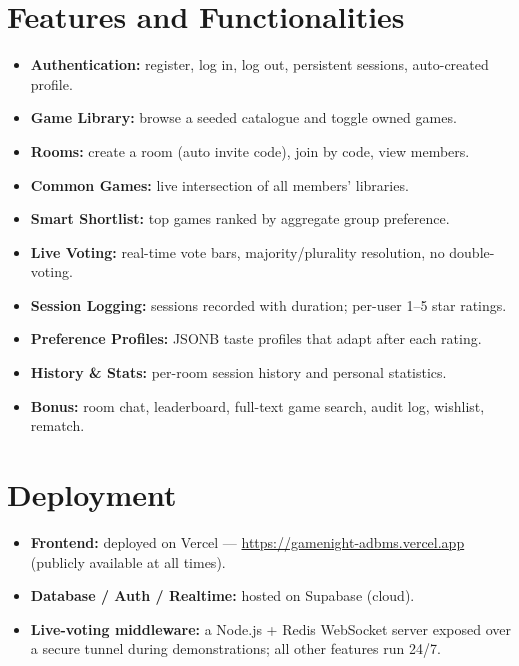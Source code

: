 \documentclass[11pt,a4paper]{article}
\begin{document}
\section{Features and Functionalities}
\begin{itemize}[leftmargin=1.4em]
  \item \textbf{Authentication:} register, log in, log out, persistent sessions, auto-created profile.
  \item \textbf{Game Library:} browse a seeded catalogue and toggle owned games.
  \item \textbf{Rooms:} create a room (auto invite code), join by code, view members.
  \item \textbf{Common Games:} live intersection of all members' libraries.
  \item \textbf{Smart Shortlist:} top games ranked by aggregate group preference.
  \item \textbf{Live Voting:} real-time vote bars, majority/plurality resolution, no double-voting.
  \item \textbf{Session Logging:} sessions recorded with duration; per-user 1--5 star ratings.
  \item \textbf{Preference Profiles:} JSONB taste profiles that adapt after each rating.
  \item \textbf{History \& Stats:} per-room session history and personal statistics.
  \item \textbf{Bonus:} room chat, leaderboard, full-text game search, audit log, wishlist, rematch.
\end{itemize}

\section{Deployment}
\begin{itemize}[leftmargin=1.4em]
  \item \textbf{Frontend:} deployed on Vercel --- \url{https://gamenight-adbms.vercel.app}
        (publicly available at all times).
  \item \textbf{Database / Auth / Realtime:} hosted on Supabase (cloud).
  \item \textbf{Live-voting middleware:} a Node.js + Redis WebSocket server exposed
        over a secure tunnel during demonstrations; all other features run 24/7.
\end{itemize}

\end{document}
